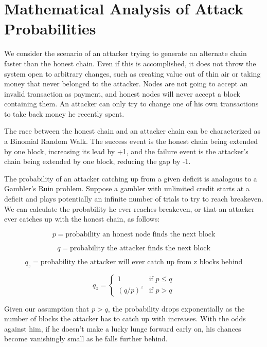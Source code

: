 \documentclass{article}
\begin{document}
\section*{Mathematical Analysis of Attack Probabilities}

We consider the scenario of an attacker trying to generate an alternate chain faster than the honest chain. Even if this is accomplished, it does not throw the system open to arbitrary changes, such as creating value out of thin air or taking money that never belonged to the attacker. Nodes are not going to accept an invalid transaction as payment, and honest nodes will never accept a block containing them. An attacker can only try to change one of his own transactions to take back money he recently spent.

The race between the honest chain and an attacker chain can be characterized as a Binomial Random Walk. The success event is the honest chain being extended by one block, increasing its lead by +1, and the failure event is the attacker's chain being extended by one block, reducing the gap by -1.

The probability of an attacker catching up from a given deficit is analogous to a Gambler's Ruin problem. Suppose a gambler with unlimited credit starts at a deficit and plays potentially an infinite number of trials to try to reach breakeven. We can calculate the probability he ever reaches breakeven, or that an attacker ever catches up with the honest chain, as follows:

\begin{equation}
p = \text{probability an honest node finds the next block}
\end{equation}

\begin{equation}
q = \text{probability the attacker finds the next block}
\end{equation}

\begin{equation}
q_z = \text{probability the attacker will ever catch up from z blocks behind}
\end{equation}

\begin{equation}
q_z = \begin{cases}
1 & \text{if } p \leq q \\
(q/p)^z & \text{if } p > q
\end{cases}
\end{equation}

Given our assumption that $p > q$, the probability drops exponentially as the number of blocks the attacker has to catch up with increases. With the odds against him, if he doesn't make a lucky lunge forward early on, his chances become vanishingly small as he falls further behind.
\end{document}
